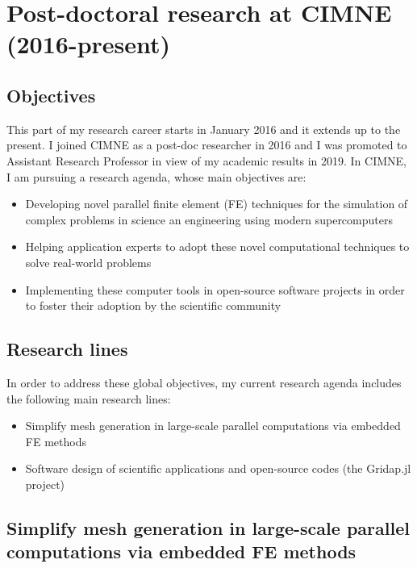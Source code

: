 \documentclass{article}
\begin{document}
\section{Post-doctoral research  at CIMNE (2016-present)} \label{sec:cimne}

\subsection{Objectives}

  This part of my research career starts in January 2016 and it extends up to the present. I joined CIMNE as a post-doc researcher in 2016 and I was promoted to Assistant Research Professor in view of my academic results in 2019. In CIMNE, I am pursuing a research agenda, whose main objectives are:

\begin{itemize}
  \item Developing novel parallel finite element (FE) techniques for the simulation of complex problems in science an engineering using modern supercomputers
\item Helping application experts to adopt these novel computational techniques to solve real-world problems
\item Implementing these computer tools in open-source software projects in order to foster their adoption by the scientific community
\end{itemize}

\subsection{Research lines}

In order to address these global objectives, my current research agenda includes the following main research lines:

\begin{itemize}
\item  Simplify mesh generation in large-scale parallel computations via embedded FE methods
\item Software design of scientific applications and open-source codes (the Gridap.jl project)
\end{itemize}

\subsection{Simplify mesh generation in large-scale parallel computations via embedded FE methods}
\end{document}
